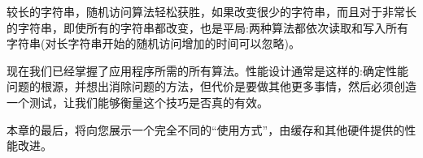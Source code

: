 较长的字符串，随机访问算法轻松获胜，如果改变很少的字符串，而且对于非常长的字符串，即使所有的字符串都改变，也是平局:两种算法都依次读取和写入所有字符串(对长字符串开始的随机访问增加的时间可以忽略)。

现在我们已经掌握了应用程序所需的所有算法。性能设计通常是这样的:确定性能问题的根源，并想出消除问题的方法，但代价是要做其他更多事情，然后必须创造一个测试，让我们能够衡量这个技巧是否真的有效。

本章的最后，将向您展示一个完全不同的“使用方式”，由缓存和其他硬件提供的性能改进。




























